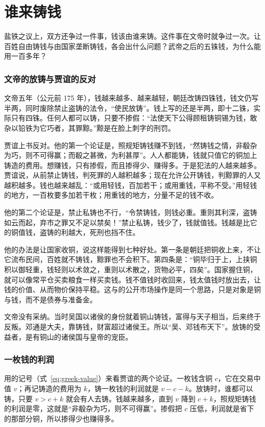 \section{谁来铸钱}\label{sec:qinhan-mint}

盐铁之议上，双方还争过一件事，钱该由谁来铸。这件事在文帝时就争过一次。让百姓自由铸钱与由国家垄断铸钱，各会出什么问题？武帝之后的五铢钱，为什么能用一百多年？

\subsubsection{文帝的放铸与贾谊的反对}
文帝五年（公元前 175 年），钱越来越多、越来越轻，朝廷改铸四铢钱，钱文仍写半两，同时废除禁止盗铸的法令，“使民放铸”\cite{hanshu}。钱上写的还是半两，即十二铢，实际只有四铢。任何人都可以铸，只要不掺假：“法使天下公得顾租铸铜锡为钱，敢杂以铅铁为它巧者，其罪黥。”\cite{hanshu}黥是在脸上刺字的刑罚。

贾谊上书反对。他的第一个论证是，照规矩铸钱赚不到钱，“然铸钱之情，非殽杂为巧，则不可得赢；而殽之甚微，为利甚厚”\cite{hanshu}。人人都能铸，钱就只值它的铜加上铸造的费用。想赚钱，只有掺假，而且掺得少、赚得多。于是犯法的人越来越多。贾谊说，从前禁止铸钱，判死罪的人越积越多；现在允许公开铸钱，判黥罪的人又越积越多。钱也越来越乱：“或用轻钱，百加若干；或用重钱，平称不受。”\cite{hanshu}用轻钱的地方，一百枚要多加若干枚；用重钱的地方，分量不足的钱不收。

他的第二个论证是，禁止私铸也不行，“令禁铸钱，则钱必重。重则其利深，盗铸如云而起，弃市之罪又不足以禁矣！”\cite{hanshu}禁止私铸，钱少了，钱就值钱。钱越是比它的铜值钱，盗铸的利越大，死刑也挡不住。

他的办法是让国家收铜，说这样能得到七种好处。第一条是朝廷把铜收上来，不让它流布民间，百姓就不铸钱，黥罪也不会积下。第四条是：“铜毕归于上，上挟铜积以御轻重，钱轻则以术敛之，重则以术散之，货物必平，四矣”\cite{hanshu}。国家握住铜，就可以像常平仓买卖粮食一样买卖钱。钱不值钱时收回来，钱太值钱时放出去，让钱的价值、从而物价保持平稳。这与的公开市场操作是同一个思路，只是对象是铜与钱，而不是债券与准备金。

文帝没有采纳。当时吴国以诸侯的身份就着铜山铸钱，富得与天子相当，后来终于反叛。邓通是大夫，靠铸钱，财富超过诸侯王。所以“吴、邓钱布天下”\cite{hanshu}。放铸的受益者，是有铜山的诸侯国与皇帝的宠臣。

\subsubsection{一枚钱的利润}
用的记号（式~\eqref{eq:greek-value}）来看贾谊的两个论证。一枚钱含铜 $c$，它在交易中值 $v$；再记铸造的费用为 $k$，铸一枚钱的利润就是 $v-c-k$。放铸时，谁都可以铸，只要 $v>c+k$ 就会有人去铸。钱越来越多，直到 $v$ 降到 $c+k$，照规矩铸钱的利润是零，这就是“非殽杂为巧，则不可得赢”。掺假把 $c$ 压低，利润就是省下的那部分铜，所以掺得少也赚得多。

